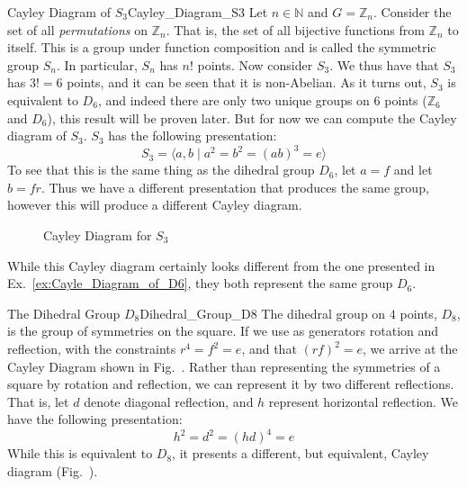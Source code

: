         \begin{lexample}{Cayley Diagram of $S_{3}$}{Cayley_Diagram_S3}
            Let $n\in\mathbb{N}$ and $G=\mathbb{Z}_{n}$. Consider the set of all
            \textit{permutations} on $\mathbb{Z}_{n}$. That
            is, the set of all bijective functions from $\mathbb{Z}_{n}$ to
            itself. This is a group under function composition and is called the
            symmetric group $S_{n}$. In particular, $S_{n}$ has $n!$ points.
            Now consider $S_{3}$. We thus have that $S_{3}$ has $3!=6$ points,
            and it can be seen that it is non-Abelian. As it turns out, $S_{3}$
            is equivalent to $D_{6}$, and indeed there are only two unique
            groups on $6$ points ($\mathbb{Z}_{6}$ and $D_{6}$), this result
            will be proven later. But for now we can compute the Cayley diagram
            of $S_{3}$. $S_{3}$ has the following presentation:
            \begin{equation}
                S_{3}=\langle{a,b}\;|\;a^{2}=b^{2}=(ab)^{3}=e\rangle
            \end{equation}
            To see that this is the same thing as the dihedral group $D_{6}$,
            let $a=f$ and let $b=fr$. Thus we have a different presentation that
            produces the same group, however this will produce a different
            Cayley diagram.
            \begin{figure}[H]
                \centering
                \captionsetup{type=figure}
                
                \caption{Cayley Diagram for $S_{3}$}
                \label{fig:Cayley_Diagram_S3}
            \end{figure}
            While this Cayley diagram certainly looks different from the one
            presented in Ex.~\ref{ex:Cayle_Diagram_of_D6}, they both represent
            the same group $D_{6}$.
        \end{lexample}
        \begin{lexample}{The Dihedral Group $D_{8}$}{Dihedral_Group_D8}
            The dihedral group on $4$ points, $D_{8}$, is the group of
            symmetries on the square. If we use as generators rotation and
            reflection, with the constraints $r^{4}=f^{2}=e$, and that
            $(rf)^{2}=e$, we arrive at the Cayley Diagram shown in
            Fig.~. Rather than representing
            the symmetries of a square by rotation and reflection, we can
            represent it by two different reflections. That is, let $d$ denote
            diagonal reflection, and $h$ represent horizontal reflection. We
            have the following presentation:
            \begin{equation}
                h^{2}=d^{2}=(hd)^{4}=e
            \end{equation}
            While this is equivalent to $D_{8}$, it presents a different, but
            equivalent, Cayley diagram
            (Fig.~).
        \end{lexample}
